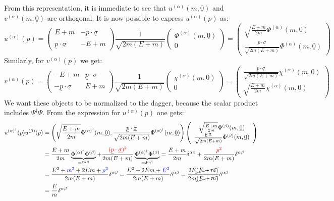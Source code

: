 \documentclass[../main.tex]{subfiles}
\begin{document}
From this representation, it is immediate to see that $u^{(\alpha)}(m,\underline{0})$ and $v^{(\alpha)}(m,\underline{0})$ are orthogonal. It is now possible to express $u^{(\alpha)}(p)$ as:
\[
u^{(\alpha)}(p)=\left(\begin{array}{cc}
    E+m & -\underline{p}\cdot\underline{\sigma} \\
    \underline{p}\cdot\underline{\sigma} & -E+m
\end{array}\right)\frac{1}{\sqrt{2m(E+m)}}\left(\begin{array}{c}
    \Phi^{(\alpha)}(m,\underline{0}) \\
    0 
\end{array}\right)=\left(\begin{array}{c}
    \sqrt{\frac{E+m}{2m}}\Phi^{(\alpha)}(m,\underline{0}) \\
    \frac{\underline{p}\cdot\underline{\sigma}}{\sqrt{2m(E+m)}}\Phi^{(\alpha)}(m,\underline{0})  
\end{array}\right)
\]
Similarly, for $v^{(\alpha)}(p)$ we get:
\[
v^{(\alpha)}(p)=\left(\begin{array}{cc}
    -E+m & \underline{p}\cdot\underline{\sigma} \\
    -\underline{p}\cdot\underline{\sigma} & E+m
\end{array}\right)\frac{1}{\sqrt{2m(E+m)}}\left(\begin{array}{c}
    \chi^{(\alpha)}(m,\underline{0}) \\
    0 
\end{array}\right)=\left(\begin{array}{c}
    \frac{\underline{p}\cdot\underline{\sigma}}{\sqrt{2m(E+m)}}\chi^{(\alpha)}(m,\underline{0}) \\
    \sqrt{\frac{E+m}{2m}}\chi^{(\alpha)}(m,\underline{0})
\end{array}\right)
\]
We want these objects to be normalized to the dagger, because the scalar product includes $\Psi^\dagger\Psi$. From the expression for $u^{(\alpha)}(p)$ one gets:
\begin{align*}
u^{(\alpha)^\dagger}(p)u^{(\beta)}(p)&=\left(
  \sqrt{\frac{E+m}{2m}}\Phi^{(\alpha)^\dagger}(m,\underline{0}), \frac{\underline{p}\cdot\underline{\sigma}}{\sqrt{2m(E+m)}}\Phi^{(\alpha)^\dagger}(m,\underline{0})
\right)\left(\begin{array}{c}
    \sqrt{\frac{E+m}{2m}}\Phi^{(\beta)}(m,\underline{0}) \\
    \frac{\underline{p}\cdot\underline{\sigma}}{\sqrt{2m(E+m)}}\Phi^{(\beta)}(m,\underline{0})  
\end{array}\right)\\
&=\frac{E+m}{2m}\underbrace{\Phi^{(\alpha)^\dagger}\Phi^{(\beta)}}_{=\delta^{\alpha\beta}}+\frac{{\color{red}(\underline{p}\cdot\underline{\sigma})^2}}{2m(E+m)}\underbrace{\Phi^{(\alpha)^\dagger}\Phi^{(\beta)}}_{=\delta^{\alpha\beta}}=\frac{E+m}{2m}\delta^{\alpha\beta}+\frac{{\color{red}p^2}}{2m(E+m)}\delta^{\alpha\beta}\\
&=\frac{E^2+{\color{blue}m^2}+2Em+{\color{blue}p^2}}{2m(E+m)}\delta^{\alpha\beta}=\frac{E^2+2Em+{\color{blue}E^2}}{2m(E+m)}\delta^{\alpha\beta}=\frac{2E\cancel{(E+m)}}{2m\cancel{(E+m)}}\delta^{\alpha\beta}\\
&=\frac{E}{m}\delta^{\alpha\beta}
\end{align*}
\end{document}
